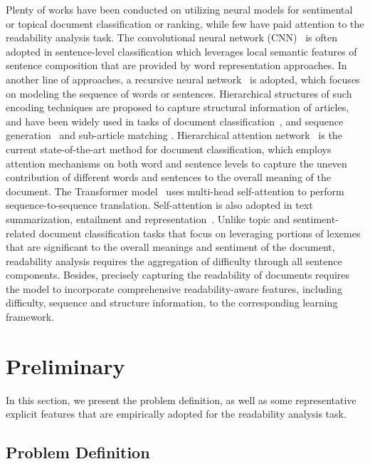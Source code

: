 \documentclass[runningheads]{llncs}
\begin{document}
Plenty of works have been conducted on utilizing neural models for sentimental or topical document classification or ranking, while few have paid attention to the readability analysis task.
The convolutional neural network (CNN)~\cite{CNN} is often adopted in sentence-level classification which leverages local semantic features of sentence composition that are provided by word representation approaches. In another line of approaches, a recursive neural network~\cite{socher2013recursive} is adopted, which focuses on modeling the sequence of words or sentences. 
Hierarchical structures of such encoding techniques are proposed to capture structural information of articles, and have been widely used in tasks of document classification~\cite{tang2015document,lin2015hierarchical,chen2019subarticle}, and sequence generation~\cite{li2015hierarchical} and sub-article matching \cite{chen2018neural}. Hierarchical attention network~\cite{RNN} is the current state-of-the-art method for document classification, which employs attention mechanisms on both word and sentence levels to capture the uneven contribution of different words and sentences to the overall meaning of the document.  The Transformer model~\cite{vaswani2017attention} uses multi-head self-attention to perform sequence-to-sequence translation. Self-attention is also adopted in text summarization, entailment and representation~\cite{parikh2016decomposable,li2018hierarchical}. Unlike topic and sentiment-related document classification tasks that focus on leveraging portions of lexemes that are significant to the overall meanings and sentiment of the document, readability analysis requires the aggregation of difficulty through all sentence components. Besides, precisely capturing the readability of documents requires the model to incorporate comprehensive readability-aware features, including difficulty, sequence and structure information, to the corresponding learning framework.
 \section{Preliminary}\label{sec:setting}

  In this section, we present the problem definition, as well as some representative explicit features that are empirically adopted for the readability analysis task.


  \subsection{Problem Definition}
\end{document}
